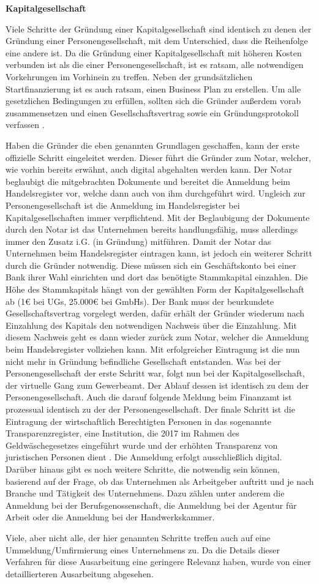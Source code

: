 \textbf{Kapitalgesellschaft}

Viele Schritte der Gründung einer Kapitalgesellschaft sind identisch zu denen der Gründung einer Personengesellschaft, mit dem Unterschied, dass die Reihenfolge eine andere ist. Da die Gründung einer Kapitalgesellschaft mit höheren Kosten verbunden ist als die einer Personengesellschaft, ist es ratsam, alle notwendigen Vorkehrungen im Vorhinein zu treffen. Neben der grundsätzlichen Startfinanzierung ist es auch ratsam, einen Business Plan zu erstellen. Um alle gesetzlichen Bedingungen zu erfüllen, sollten sich die Gründer außerdem vorab zusammensetzen und einen Gesellschaftsvertrag sowie ein Gründungsprotokoll verfassen . 

Haben die Gründer die eben genannten Grundlagen geschaffen, kann der erste offizielle Schritt eingeleitet werden. Dieser führt die Gründer zum Notar, welcher, wie vorhin bereits erwähnt, auch digital abgehalten werden kann. Der Notar beglaubigt die mitgebrachten Dokumente und bereitet die Anmeldung beim Handelsregister vor, welche dann auch von ihm durchgeführt wird. Ungleich zur Personengesellschaft ist die Anmeldung im Handelsregister bei Kapitalgesellschaften immer verpflichtend. Mit der Beglaubigung der Dokumente durch den Notar ist das Unternehmen bereits handlungsfähig, muss allerdings immer den Zusatz i.G. (in Gründung) mitführen. Damit der Notar das Unternehmen beim Handelsregister eintragen kann, ist jedoch ein weiterer Schritt durch die Gründer notwendig. Diese müssen sich ein Geschäftskonto bei einer Bank ihrer Wahl einrichten und dort das benötigte Stammkapital einzahlen. Die Höhe des Stammkapitals hängt von der gewählten Form der Kapitalgesellschaft ab (1€ bei UGs, 25.000€ bei GmbHs). Der Bank muss der beurkundete Gesellschaftsvertrag vorgelegt werden, dafür erhält der Gründer wiederum nach Einzahlung des Kapitals den notwendigen Nachweis über die Einzahlung. Mit diesem Nachweis geht es dann wieder zurück zum Notar, welcher die Anmeldung beim Handelsregister vollziehen kann. Mit erfolgreicher Eintragung ist die nun nicht mehr in Gründung befindliche Gesellschaft entstanden. Was bei der Personengesellschaft der erste Schritt war, folgt nun bei der Kapitalgesellschaft, der virtuelle Gang zum Gewerbeamt. Der Ablauf dessen ist identisch zu dem der Personengesellschaft. Auch die darauf folgende Meldung beim Finanzamt ist prozessual identisch zu der der Personengesellschaft. Der finale Schritt ist die Eintragung der wirtschaftlich Berechtigten Personen in das sogenannte Transparenzregister, eine Institution, die 2017 im Rahmen des Geldwäschegesetzes eingeführt wurde und der erhöhten Transparenz von juristischen Personen dient . Die Anmeldung erfolgt ausschließlich digital. Darüber hinaus gibt es noch weitere Schritte, die notwendig sein können, basierend auf der Frage, ob das Unternehmen als Arbeitgeber auftritt und je nach Branche und Tätigkeit des Unternehmens. Dazu zählen unter anderem die Anmeldung bei der Berufsgenossenschaft, die Anmeldung bei der Agentur für Arbeit oder die Anmeldung bei der Handwerkskammer. 

Viele, aber nicht alle, der hier genannten Schritte treffen auch auf eine Ummeldung/Umfirmierung eines Unternehmens zu. Da die Details dieser Verfahren für diese Ausarbeitung eine geringere Relevanz haben, wurde von einer detaillierteren Ausarbeitung abgesehen.